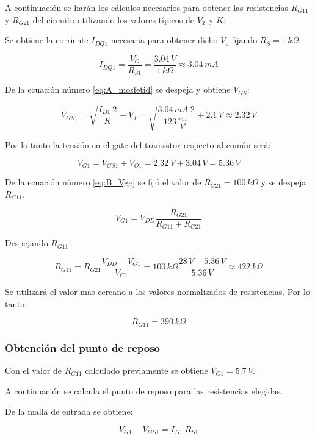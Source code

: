\documentclass[10pt,spanish,a4paper,notitlepage]{article}
\begin{document}
A continuación se harán los cálculos necesarios para obtener las resistencias 
$R_{G11}$ y $R_{G21}$ del circuito utilizando los valores típicos
de $V_T$ y $K$:

Se obtiene la corriente $I_{DQ1}$ necesaria para obtener dicho $V_o$
fijando $R_S = 1\,\unit{k\Omega}$:

\[ \displaystyle I_{DQ1} = \frac{V_O}{R_{S1}} = 
\frac{3.04\,\unit{V}}{1\,\unit{k\Omega}} \approx 3.04\,\unit{mA} \]

De la ecuación número \ref{eq:A_mosfetid} se despeja y obtiene $V_{GS}$:

\[ \displaystyle V_{GS1} = \sqrt{\frac{I_{D1}\ 2}{K}} + V_T 
= \sqrt{\frac{3.04\,\unit{mA}\ 2}{123\,\unit{\frac{mA}{V^2}}}} + 2.1\,\unit{V} \approx 2.32\,\unit{V} \]

Por lo tanto la tensión en el gate del transistor respecto al común será:

\[ \displaystyle V_{G1} = V_{GS1} + V_{O1} = 
2.32\,\unit{V} + 3.04\, \unit{V} = 
5.36\,\unit{V} \]

De la ecuación número \ref{eq:B_Vgg} se fijó el valor de $R_{G21} = 100\,\unit{k\Omega}$ y se despeja $R_{G11}$.


\begin{equation}
V_{G1} = V_{DD}\frac{R_{G21}}{R_{G11}+R_{G21}} 
\label{eq:B_Vgg}
\end{equation}

Despejando $R_{G11}$:

\[ \displaystyle R_{G11} = R_{G21} \frac{V_{DD} - V_{G1}}{V_{G1}}
= 100\,\unit{k\Omega} \frac{28\,\unit{V} - 5.36\,\unit{V}}{5.36\,\unit{V}}
\approx 422\,\unit{k\Omega} \]

Se utilizará el valor mas cercano a los valores normalizados de resistencias. Por lo tanto:

\[ \displaystyle R_{G11} = 390\,\unit{k\Omega} \]

\subsubsection{Obtención del punto de reposo}

Con el valor de $R_{G11}$ calculado previamente se obtiene $V_{G1} = 5.7\,\unit{V}$.

A continuación se calcula el punto de reposo para 
las resistencias elegidas. 

De la malla de entrada se obtiene:

\begin{equation}
V_{G1} - V_{GS1} = I_{D1}\ R_{S1}
\label{eq:B_entrada}
\end{equation}
\end{document}
